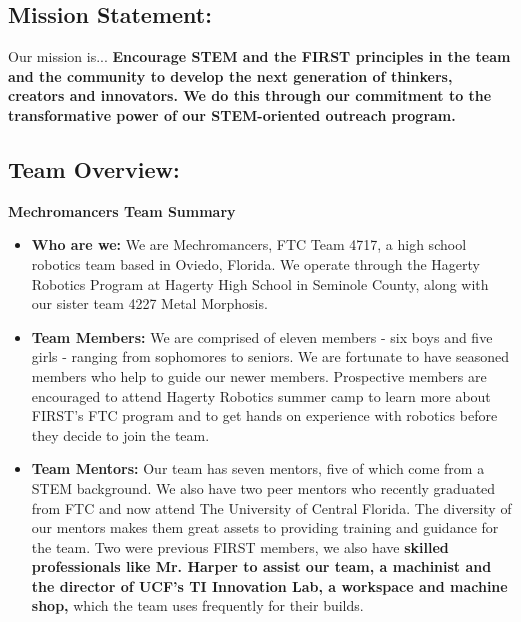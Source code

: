 \subsection*{\textbf{\Huge Mission Statement:}}
\vspace{.2cm}
\setlength{\parindent}{.25in} 

\large{Our mission is...}
\newline 
\textbf{Encourage STEM and the FIRST principles in the team and the community to develop the next generation of thinkers, creators and innovators. We do this through our commitment to the transformative power of our STEM-oriented outreach program.}

\subsection*{\textbf{\Huge Team Overview:}}
\vspace{.2cm}
\setlength{\parindent}{.25in} 

\textbf{\Large Mechromancers Team Summary}

\begin{itemize}
 \item \textbf{Who are we:} We are Mechromancers, FTC Team 4717, a high school robotics team based in Oviedo, Florida. We operate through the Hagerty Robotics Program at Hagerty High School in Seminole County, along with our sister team 4227 Metal Morphosis.
 \item \textbf{Team Members:}  We are comprised of eleven members -  six boys and five girls - ranging from sophomores to seniors. We are fortunate to have seasoned members who help to guide our newer members. Prospective members are encouraged to attend Hagerty Robotics summer camp to learn more about FIRST’s FTC program and to get hands on experience with robotics before they decide to join the team. 
 \item \textbf{Team Mentors:} Our team has seven mentors, five of which come from a STEM background. We also have two peer mentors who recently graduated from FTC and now attend The University of Central Florida. The diversity of our mentors makes them great assets to providing training and guidance for the team. Two were previous FIRST members, we also have \textbf{skilled professionals like Mr. Harper to assist our team, a machinist and the director of UCF's TI Innovation Lab, a workspace and machine shop,} which the team uses frequently for their builds.
\end{itemize}

